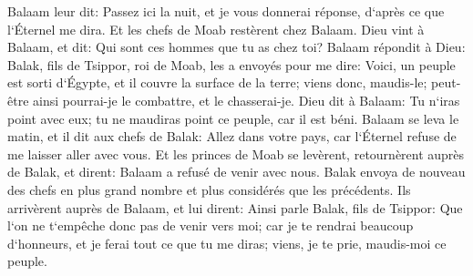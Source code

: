 \verse Balaam leur dit: Passez ici la nuit, et je vous donnerai réponse, d`après ce que l`Éternel me dira. Et les chefs de Moab restèrent chez Balaam. 
\verse Dieu vint à Balaam, et dit: Qui sont ces hommes que tu as chez toi? 
\verse Balaam répondit à Dieu: Balak, fils de Tsippor, roi de Moab, les a envoyés pour me dire: 
\verse Voici, un peuple est sorti d`Égypte, et il couvre la surface de la terre; viens donc, maudis-le; peut-être ainsi pourrai-je le combattre, et le chasserai-je. 
\verse Dieu dit à Balaam: Tu n`iras point avec eux; tu ne maudiras point ce peuple, car il est béni. 
\verse Balaam se leva le matin, et il dit aux chefs de Balak: Allez dans votre pays, car l`Éternel refuse de me laisser aller avec vous. 
\verse Et les princes de Moab se levèrent, retournèrent auprès de Balak, et dirent: Balaam a refusé de venir avec nous. 
\verse Balak envoya de nouveau des chefs en plus grand nombre et plus considérés que les précédents. 
\verse Ils arrivèrent auprès de Balaam, et lui dirent: Ainsi parle Balak, fils de Tsippor: Que l`on ne t`empêche donc pas de venir vers moi; 
\verse car je te rendrai beaucoup d`honneurs, et je ferai tout ce que tu me diras; viens, je te prie, maudis-moi ce peuple. 
